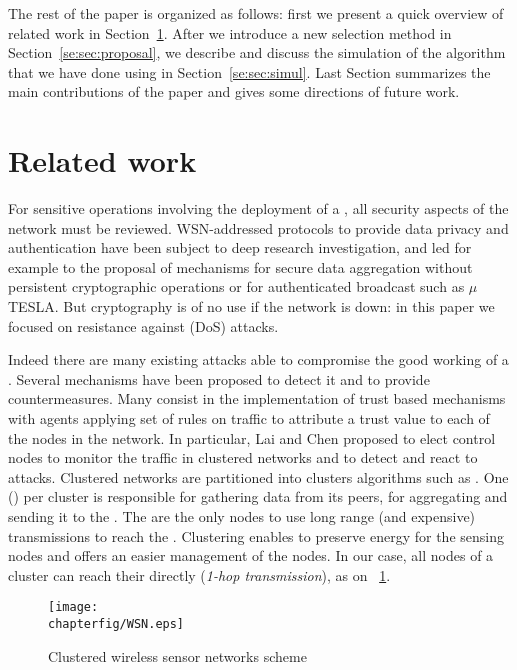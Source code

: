 The rest of the paper is organized as follows: first we present a quick overview of related work in Section~\ref{se:sec:related}. After we introduce a new \cn selection method in Section~\ref{se:sec:proposal}, we describe and discuss the simulation of the algorithm that we have done using \nsiii in Section~\ref{se:sec:simul}.
Last Section summarizes the main contributions of the paper and gives some directions of future work.

\section{Related work}
\label{se:sec:related}

For sensitive operations involving the deployment of a \wsn, all security aspects of the network must be reviewed.
WSN-addressed protocols to provide data privacy\cite{OX09} and authentication\cite{SOBMCN11} have been subject to deep research investigation, and led for example to the proposal of mechanisms for secure data aggregation without persistent cryptographic operations\cite{WDSX07} or for authenticated broadcast such as $\mu$TESLA\cite{PSWCT02}.
But cryptography is of no use if the network is down: in this paper we focused on resistance against \dos (DoS) attacks.

Indeed there are many existing attacks able to compromise the good working of a \wsn.%
Several mechanisms have been proposed to detect it and to provide countermeasures\cite{SSS11}. %
Many consist in the implementation of trust based mechanisms\cite{MC10,F-GRL07} with agents applying set of rules\cite{RKKK13} on traffic to attribute a trust value to each of the nodes in the network.
In particular, Lai and Chen\cite{LC08} proposed to elect control nodes to monitor the traffic in clustered networks and to detect and react to \dos attacks.
Clustered networks are partitioned into clusters \via algorithms such as \leach\cite{HHT02}.
One \ch (\CH) per cluster is responsible for gathering data from its peers, for aggregating and sending it to the \bs.
The \CHs are the only nodes to use long range (and expensive) transmissions to reach the \bs.
Clustering enables to preserve energy for the sensing nodes and offers an easier management of the nodes.
In our case, all nodes of a cluster can reach their \ch directly (\emph{1-hop transmission}), as on \figurename~\ref{se:fig:wsn}.
\begin{figure}[h]
    \centering
    \texttt{[image: \\chapterfig/WSN.eps]}
    \caption{Clustered wireless sensor networks scheme}\label{se:fig:wsn}
\end{figure}

